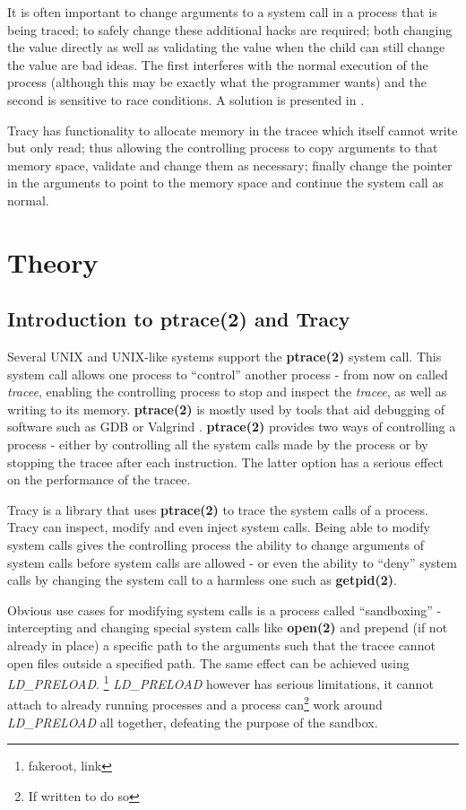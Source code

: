 \documentclass[a4paper, twoside, 10pt]{report}
\begin{document}
It is often important to change arguments to a system call in a process that is
being traced; to safely change these additional hacks are required;
both changing the value directly as well as validating the value when the child
can still change the value are bad ideas.
The first interferes with the normal execution of the process
(although this may be exactly what the programmer wants) and the second is
sensitive to race conditions. A solution is presented in
\cite{Noordende_asecure}.

Tracy has functionality to allocate memory in the
tracee which itself cannot write but only read; thus allowing the controlling
process to copy arguments to that memory space, validate and change them as
necessary; finally change the pointer in the arguments to point to the memory
space and continue the system call as normal.

\chapter{Theory}

\section{Introduction to ptrace(2) and Tracy}

Several UNIX and UNIX-like systems support the \textbf{ptrace(2)} system call.
This system call allows one process to ``control'' another process - from now on
called \textit{tracee}, enabling the controlling process to stop and inspect
the \textit{tracee}, as well as writing to its memory. \textbf{ptrace(2)} is
mostly used by tools that aid debugging of software such as GDB\cite{} or
Valgrind \cite{}. \textbf{ptrace(2)} provides two ways of controlling a process
- either by controlling all the system calls made by the process or by stopping
the tracee after each instruction. The latter option has a serious effect on the
performance of the tracee.

Tracy is a library that uses \textbf{ptrace(2)} to trace the system calls of a
process. Tracy can inspect, modify and even inject system calls. Being able to
modify system calls gives the controlling process the ability to change
arguments of system calls before system calls are allowed - or even the ability
to ``deny'' system calls by changing the system call to a harmless one such as
\textbf{getpid(2)}.

Obvious use cases for modifying system calls is a process
called ``sandboxing'' - intercepting and changing special system calls like
\textbf{open(2)} and prepend (if not already in place) a specific path to the
arguments such that the tracee cannot open files outside a specified path.
The same effect can be achieved using \textit{LD\_PRELOAD}. \footnote{fakeroot,
link}%
\textit{LD\_PRELOAD} however has serious limitations, it cannot attach to
already running processes and a process can\footnote{If written to do so} work
around \textit{LD\_PRELOAD} all together, defeating the purpose of the sandbox.
\end{document}
